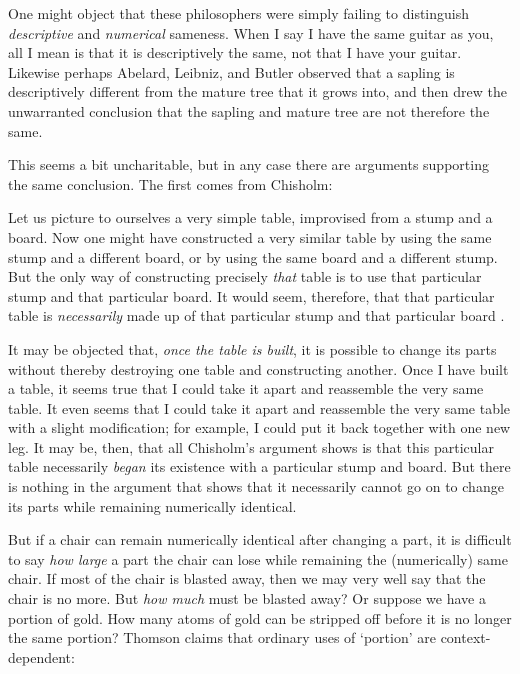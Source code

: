 \documentclass[11pt]{article}
\newenvironment{squote}{%
\begin{spacing}{1}
\begin{list}{}{%
\setlength{\labelwidth}{0pt}%
\rightmargin\leftmargin%
}
\item\relax
}{%
\end{list}%
\end{spacing}
}
\begin{document}
\begin{spacing}{1.5}
One might object that these philosophers were simply failing to
distinguish {\em descriptive} and {\em numerical} sameness.  When I
say I have the same guitar as you, all I mean is that it is
descriptively the same, not that I have your guitar.  Likewise perhaps
Abelard, Leibniz, and Butler observed that a sapling is descriptively
different from the mature tree that it grows into, and then drew the
unwarranted conclusion that the sapling and mature tree are not
therefore the same.

This seems a bit uncharitable, but in any case there are arguments
supporting the same conclusion.  The first comes from Chisholm:

\begin{squote}
Let us picture to ourselves a very simple table, improvised from a
stump and a board.  Now one might have constructed a very similar
table by using the same stump and a different board, or by using the
same board and a different stump.  But the only way of constructing
precisely {\em that} table is to use that particular stump and that
particular board.  It would seem, therefore, that that particular
table is {\em necessarily} made up of that particular stump and that
particular board \citeyearpar[146]{chisholm1979}.
\end{squote}

It may be objected that, {\em once the table is built}, it is possible
to change its parts without thereby destroying one table and
constructing another.  Once I have built a table, it seems true that I
could take it apart and reassemble the very same table.  It even seems
that I could take it apart and reassemble the very same table with a
slight modification; for example, I could put it back together with
one new leg.  It may be, then, that all Chisholm's argument shows is
that this particular table necessarily {\em began} its existence with
a particular stump and board.  But there is nothing in the argument
that shows that it necessarily cannot go on to change its parts while
remaining numerically identical.

But if a chair can remain numerically identical after changing a part,
it is difficult to say {\em how large} a part the chair can lose while
remaining the (numerically) same chair.  If most of the chair is
blasted away, then we may very well say that the chair is no more.
But {\em how much} must be blasted away?  Or suppose we have a portion
of gold.  How many atoms of gold can be stripped off before it is no
longer the same portion?  Thomson claims that ordinary uses of
`portion' are context-dependent:


\end{spacing}
\end{document}
